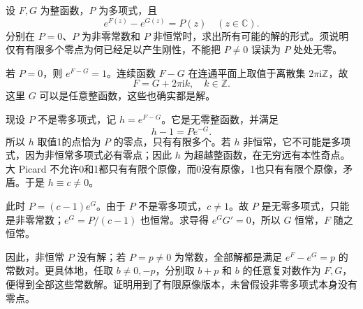 \begin{exercise}[两个指数之差为多项式]\label{b3:ex:14-5}
设 \(F,G\) 为整函数，\(P\) 为多项式，且
\[
 e^{F(z)}-e^{G(z)}=P(z)\quad(z\in\mathbb C).
\]
分别在 \(P=0\)、\(P\) 为非零常数和 \(P\) 非恒常时，求出所有可能的解的形式。须说明仅有有限多个零点为何已经足以产生刚性，不能把 \(P\ne0\) 误读为 \(P\) 处处无零。
\end{exercise}
\begin{solution}
若 \(P=0\)，则 \(e^{F-G}=1\)。连续函数 \(F-G\) 在连通平面上取值于离散集 \(2\pi\mathrm i\mathbb Z\)，故
\[
 F=G+2\pi\mathrm i k,\quad k\in\mathbb Z.
\]
这里 \(G\) 可以是任意整函数，这些也确实都是解。

现设 \(P\) 不是零多项式，记 \(h=e^{F-G}\)。它是无零整函数，并满足
\[
 h-1=P e^{-G}.
\]
所以 \(h\) 取值1的点恰为 \(P\) 的零点，只有有限多个。若 \(h\) 非恒常，它不可能是多项式，因为非恒常多项式必有零点；因此 \(h\) 为超越整函数，在无穷远有本性奇点。大 Picard 不允许0和1都只有有限个原像，而0没有原像，1也只有有限个原像，矛盾。于是 \(h\equiv c\ne0\)。

此时 \(P=(c-1)e^G\)。由于 \(P\) 不是零多项式，\(c\ne1\)。故 \(P\) 是无零多项式，只能是非零常数；\(e^G=P/(c-1)\) 也恒常。求导得 \(e^G G'=0\)，所以 \(G\) 恒常，\(F\) 随之恒常。

因此，非恒常 \(P\) 没有解；若 \(P=p\ne0\) 为常数，全部解都是满足 \(e^F-e^G=p\) 的常数对。更具体地，任取 \(b\ne0,-p\)，分别取 \(b+p\) 和 \(b\) 的任意复对数作为 \(F,G\)，便得到全部这些常数解。证明用到了有限原像版本，未曾假设非零多项式本身没有零点。
\end{solution}

